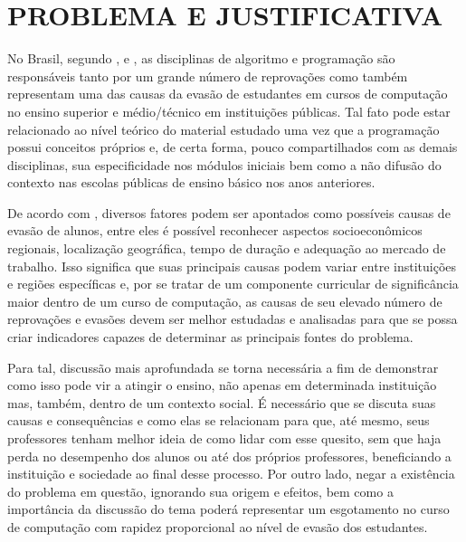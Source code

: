 % 
%


\chapter{PROBLEMA E JUSTIFICATIVA}
\label{chap:justificativa}

No Brasil, segundo ,  e , as disciplinas de algoritmo e programação são responsáveis tanto por um grande número de reprovações como também representam uma das causas da evasão de estudantes em cursos de computação no ensino superior e médio/técnico em instituições públicas. Tal fato pode estar relacionado ao nível teórico do material estudado uma vez que a programação possui conceitos próprios e, de certa forma, pouco compartilhados com as demais disciplinas, sua especificidade nos módulos iniciais bem como a não difusão do contexto nas escolas públicas de ensino básico nos anos anteriores.

De acordo com , diversos fatores podem ser apontados como possíveis causas de evasão de alunos, entre eles é possível reconhecer aspectos socioeconômicos regionais, localização geográfica, tempo de duração e adequação ao mercado de trabalho. Isso significa que suas principais causas podem variar entre instituições e regiões específicas e, por se tratar de um componente curricular de significância maior dentro de um curso de computação, as causas de seu elevado número de reprovações e evasões devem ser melhor estudadas e analisadas para que se possa criar indicadores capazes de determinar as principais fontes do problema.

Para tal, discussão mais aprofundada se torna necessária a fim de demonstrar como isso pode vir a atingir o ensino, não apenas em determinada instituição mas, também, dentro de um contexto social. É necessário que se discuta suas causas e consequências e como elas se relacionam para que, até mesmo, seus professores tenham melhor ideia de como lidar com esse quesito, sem que haja perda no desempenho dos alunos ou até dos próprios professores, beneficiando a instituição e sociedade ao final desse processo. Por outro lado, negar a existência do problema em questão, ignorando sua origem e efeitos, bem como a importância da discussão do tema poderá representar um esgotamento no curso de computação com rapidez proporcional ao nível de evasão dos estudantes.

